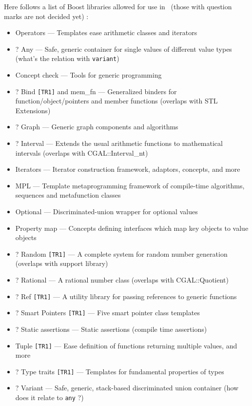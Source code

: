 Here follows a list of Boost libraries allowed for use in \cgal\ (those
with question marks are not decided yet) :
\begin{itemize}
\item Operators --- Templates ease arithmetic classes and iterators
\item ? Any --- Safe, generic container for single values of different value
      types (what's the relation with \texttt{variant})
\item Concept check --- Tools for generic programming
\item ? Bind \texttt{[TR1]} and  mem\_fn --- Generalized binders for
      function/object/pointers and member functions (overlaps with STL
      Extensions)
\item ? Graph --- Generic graph components and algorithms
\item ? Interval --- Extends the usual arithmetic functions to mathematical intervals (overlaps with CGAL::Interval\_nt)
\item Iterators --- Iterator construction framework, adaptors, concepts, and more
\item MPL --- Template metaprogramming framework of compile-time algorithms, sequences and metafunction classes
\item Optional --- Discriminated-union wrapper for optional values
\item Property map --- Concepts defining interfaces which map key objects to value objects
\item ? Random \texttt{[TR1]} --- A complete system for random number generation
      (overlaps with support library)
\item ? Rational --- A rational number class (overlaps with CGAL::Quotient)
\item ? Ref \texttt{[TR1]} --- A utility library for passing references to generic functions
\item ? Smart Pointers \texttt{[TR1]} --- Five smart pointer class templates
\item ? Static assertions --- Static assertions (compile time assertions)
\item Tuple \texttt{[TR1]} --- Ease definition of functions returning multiple values, and more
\item ? Type traits \texttt{[TR1]} --- Templates for fundamental properties of types
\item ? Variant --- Safe, generic, stack-based discriminated union container
      (how does it relate to \texttt{any} ?)
\end{itemize}


